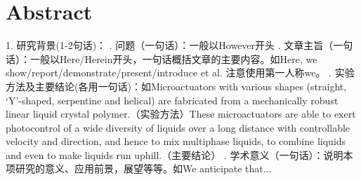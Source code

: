 %
\chapter*{Abstract}
\label{sec:abstract}
\vspace*{-10mm}

1. 研究背景(1-2句话)： . 问题（一句话）：一般以However开头 . 文章主旨（一句话）：一般以Here/Herein开头，一句话概括文章的主要内容。如Here, we show/report/demonstrate/present/introduce et al. 注意使用第一人称we。 . 实验方法及主要结论(各用一句话)：如Microactuators with various shapes (straight, ‘Y’-shaped, serpentine and helical) are fabricated from a mechanically robust linear liquid crystal polymer.（实验方法）These microactuators are able to exert photocontrol of a wide diversity of liquids over a long distance with controllable velocity and direction, and      hence to mix multiphase liquids, to combine liquids and even to make liquids run uphill.（主要结论） . 学术意义（一句话）：说明本项研究的意义、应用前景，展望等等。如We anticipate that...
\vspace*{20mm}


